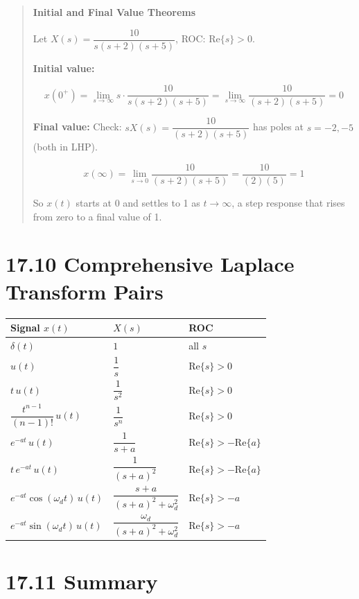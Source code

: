 \documentclass[11pt]{article}
\begin{document}
\begin{quote}
\textbf{Initial and Final Value Theorems}

Let $X(s) = \dfrac{10}{s(s+2)(s+5)}$, ROC: $\text{Re}\{s\} > 0$.

\textbf{Initial value:}

\[x(0^+) = \lim_{s \to \infty} s \cdot \frac{10}{s(s+2)(s+5)} = \lim_{s \to \infty} \frac{10}{(s+2)(s+5)} = 0\]

\textbf{Final value:} Check: $sX(s) = \dfrac{10}{(s+2)(s+5)}$ has poles at $s = -2, -5$ (both in LHP). \checkmark

\[x(\infty) = \lim_{s \to 0} \frac{10}{(s+2)(s+5)} = \frac{10}{(2)(5)} = 1\]

So $x(t)$ starts at 0 and settles to 1 as $t \to \infty$, a step response that rises from zero to a final value of 1.
\end{quote}

\section*{17.10 Comprehensive Laplace Transform Pairs}

\begin{center}
\begin{tabular}{|l|l|l|}
\hline
\textbf{Signal $x(t)$} & \textbf{$X(s)$} & \textbf{ROC} \\
\hline
$\delta(t)$ & $1$ & all $s$ \\
\hline
$u(t)$ & $\dfrac{1}{s}$ & $\text{Re}\{s\} > 0$ \\
\hline
$t\, u(t)$ & $\dfrac{1}{s^2}$ & $\text{Re}\{s\} > 0$ \\
\hline
$\dfrac{t^{n-1}}{(n-1)!}\, u(t)$ & $\dfrac{1}{s^n}$ & $\text{Re}\{s\} > 0$ \\
\hline
$e^{-at}\, u(t)$ & $\dfrac{1}{s+a}$ & $\text{Re}\{s\} > -\text{Re}\{a\}$ \\
\hline
$t\, e^{-at}\, u(t)$ & $\dfrac{1}{(s+a)^2}$ & $\text{Re}\{s\} > -\text{Re}\{a\}$ \\
\hline
$e^{-at} \cos(\omega_d t)\, u(t)$ & $\dfrac{s+a}{(s+a)^2 + \omega_d^2}$ & $\text{Re}\{s\} > -a$ \\
\hline
$e^{-at} \sin(\omega_d t)\, u(t)$ & $\dfrac{\omega_d}{(s+a)^2 + \omega_d^2}$ & $\text{Re}\{s\} > -a$ \\
\hline
\end{tabular}
\end{center}

\section*{17.11 Summary}
\end{document}
